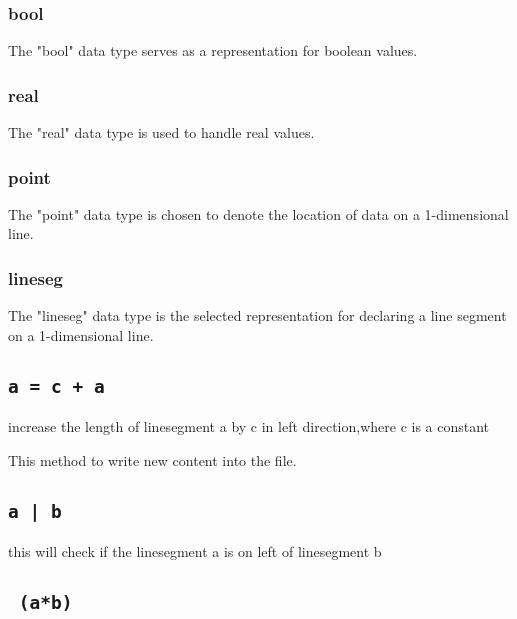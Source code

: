 \documentclass{article}
\begin{document}
\subsubsection{bool}
\begin{description}[leftmargin=1cm]
  \item[Usage:] The "bool" data type serves as a representation for boolean values.
\end{description}

\subsubsection{real}
\begin{description}[leftmargin=1cm]
  \item[Usage:] The "real" data type is used to handle real values.
\end{description}

\subsubsection{point}
\begin{description}[leftmargin=1cm]
  \item[Usage:] The "point" data type is chosen to denote the location of data on a 1-dimensional line.
\end{description}

\subsubsection{lineseg}
\begin{description}[leftmargin=1cm]
  \item[Usage:] The "lineseg" data type is the selected representation for declaring a line segment on a 1-dimensional line.
\end{description}
\subsection{\texttt{a = c + a}}
increase the length of linesegment a by c in left direction,where c is a constant

This method to write new content into the file.
\subsection{\texttt{a | b}}

this  will check if the linesegment a is on left of linesegment b
\subsection{\texttt{\string~(a*b)}}
\end{document}
